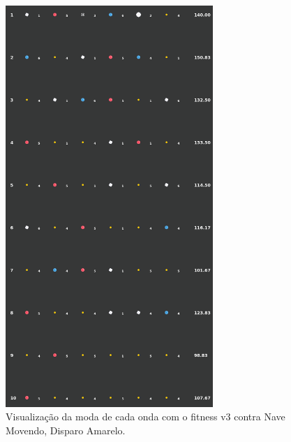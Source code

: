 \begin{figure}[H]
  \centering
  \includegraphics[width=0.7\textwidth]{figuras/ss/ss_yellowmove_ai_mode_2_1.png}
  \caption{Visualização da moda de cada onda com o fitness v3 contra Nave Movendo, Disparo Amarelo.}
  \label{fig:ss-moda-ym-2-1}
\end{figure}

